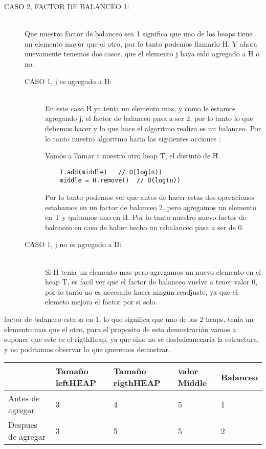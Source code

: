 {\begin{description}
\item[CASO 2, FACTOR DE BALANCEO 1:] \hfill \\
    Que nuestro factor de balanceo sea 1 significa que uno de los heaps tiene un elemento mayor que el otro, por lo tanto podemos llamarlo H. Y ahora nuevamente tenemos dos casos. que el elemento j haya sido agregado a H o no.
    
    
\begin{center}
\begin{description}
\item[CASO 1, j es agregado a H:] \hfill \\
    En este caso H ya tenia un elemento mas, y como le estamos agregando j, el factor de balanceo pasa a ser 2. por lo tanto lo que debemos hacer y lo que hace el algoritmo realiza es un balanceo. Por lo tanto nuestro algoritmo haria las siguientes acciones :
    
    Vamos a llamar a nuestro otro heap T, el distinto de H.
    \begin{verbatim}
    T.add(middle)   // O(log(n))
    middle = H.remove()  // O(log(n)) 
    \end{verbatim}
Por lo tanto podemos ver que antes de hacer estas dos operaciones estabamos en un factor de balanceo 2, pero agregamos un elemento en T y quitamos uno en H. Por lo tanto nuestro nuevo factor de balanceo en caso de haber hecho un rebalanceo pasa a ser de 0.
\item[CASO 1, j no es agregado a H:] \hfill \\
    Si H tenia un elemento mas pero agregamos un nuevo elemento en el heap T, es facil ver que el factor de balanceo vuelve a tener valor 0, por lo tanto no es necesario hacer ningun readjuste, ya que el elemeto mejora el factor por si solo.

\end{description}
\end{center}

\end{description}

factor de balanceo estaba en 1, lo que significa que uno de los 2 heaps, tenia un elemento mas que el otro, para el proposito de esta demostraci\'on vamos a suponer que este es el rigthHeap, ya que sino no se desbaleancearia la estructura, y no podriamos observar lo que queremos demostrar.



\begin{table}[htb]
\centering
\begin{tabular}{|l|l|l|l|l|}
\hline
    & Tama\~no leftHEAP & Tama\~no rigthHEAP  & valor Middle & Balanceo     \\ \hline
Antes de agregar       & 3  &  4 & 5 & 1       \\ \hline
Despues de agregar & 3 & 5 & 5& 2 \\ \hline


\end{tabular}
\end{table}}
